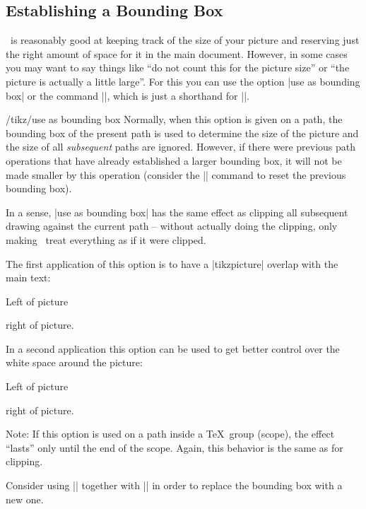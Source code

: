 \subsection{Establishing a Bounding Box}

\pgfname\ is reasonably good at keeping track of the size of your picture and
reserving just the right amount of space for it in the main document. However,
in some cases you may want to say things like ``do not count this for the
picture size'' or ``the picture is actually a little large''. For this you can
use the option |use as bounding box| or the command |\useasboundingbox|, which
is just a shorthand for ||.

\begin{key}{/tikz/use as bounding box}
    Normally, when this option is given on a path, the bounding box of the
    present path is used to determine the size of the picture and the size of
    all \emph{subsequent} paths are ignored. However, if there were previous
    path operations that have already established a larger bounding box, it
    will not be made smaller by this operation (consider the
    |\pgfresetboundingbox| command to reset the previous bounding box).

    In a sense, |use as bounding box| has the same effect as clipping all
    subsequent drawing against the current path -- without actually doing the
    clipping, only making \pgfname\ treat everything as if it were clipped.

    The first application of this option is to have a |{tikzpicture}| overlap
    with the main text:
\begin{codeexample}[]
Left of pictureright of picture.
\end{codeexample}

    In a second application this option can be used to get better control over
    the white space around the picture:
\begin{codeexample}[]
Left of picture
right of picture.
\end{codeexample}

    Note: If this option is used on a path inside a \TeX\ group (scope), the
    effect ``lasts'' only until the end of the scope. Again, this behavior is
    the same as for clipping.

    Consider using |\useasboundingbox| together with |\pgfresetboundingbox| in
    order to replace the bounding box with a new one.
\end{key}

